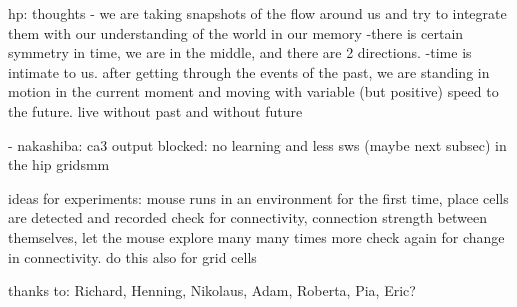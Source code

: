   hp: thoughts
  - we are taking snapshots of the flow around us and try to integrate them with our
  understanding of the world in our memory
  -there is certain symmetry in time, we are in the middle, and there are 2 directions.
  -time is intimate to us. after getting through the events of the past, we are
  standing in motion in the current moment and moving with variable (but
  positive) speed to the future.
  live without past and without future

  - nakashiba: ca3 output blocked: no learning and less sws (maybe next subsec)
  in the hip
  gridsmm

  ideas for experiments:
  mouse runs in an environment for the first time, place cells are detected and recorded
  check for connectivity, connection strength between themselves, let the mouse explore many many times more
  check again for change in connectivity.
  do this also for grid cells



thanks to: Richard, Henning, Nikolaus, Adam, Roberta, Pia, Eric?


